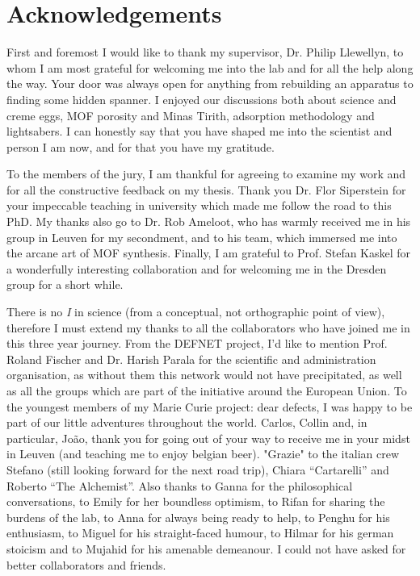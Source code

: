 
\chapter{Acknowledgements}

First and foremost I would like to thank my supervisor, Dr. Philip Llewellyn,
to whom I am most grateful for welcoming me into the lab and for all the help
along the way. Your door was always open for anything from rebuilding
an apparatus to finding some hidden spanner. I enjoyed our discussions 
both about science and creme eggs, MOF porosity and Minas Tirith, adsorption 
methodology and lightsabers. I can honestly say that you have shaped
me into the scientist and person I am now, and for that you have my gratitude.

To the members of the jury, I am thankful for agreeing to examine 
my work and for all the constructive feedback on my thesis.
Thank you Dr. Flor Siperstein for your impeccable teaching in university which
made me follow the road to this PhD. My thanks also go to Dr. Rob Ameloot,
who has warmly received me in his group in Leuven for my secondment, and 
to his team, which immersed me into the arcane art of MOF synthesis.
Finally, I am grateful to Prof. Stefan Kaskel for a wonderfully interesting
collaboration and for welcoming me in the Dresden group for a
short while.

There is no \textit{I} in science (from a conceptual, not orthographic
point of view), therefore I must extend my thanks to all the collaborators
who have joined me in this three year journey. From the DEFNET project,
I'd like to mention Prof. Roland Fischer and Dr. Harish Parala for the 
scientific and administration organisation, as without them this network
would not have precipitated, as well as all the groups which are part 
of the initiative around the European Union. To the youngest members of 
my Marie Curie project: dear defects, I was happy to be part of our little
adventures throughout the world. Carlos, Collin and, in particular, João,
thank you for going out of your way to receive me in your midst in Leuven
(and teaching me to enjoy belgian beer). "Grazie" to the italian crew 
Stefano (still looking forward for the next road trip), Chiara ``Cartarelli''
and Roberto ``The Alchemist''. Also thanks to Ganna for the philosophical 
conversations, to Emily for her boundless optimism, to Rifan for sharing
the burdens of the lab, to Anna for always being ready to help,
to Penghu for his enthusiasm, to Miguel for his straight-faced humour,
to Hilmar for his german stoicism and to Mujahid for his amenable demeanour.
I could not have asked for better collaborators and friends.

